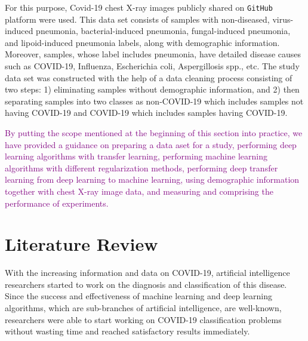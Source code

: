 
For this purpose, Covid-19 chest X-ray images publicly shared on \texttt{GitHub} platform were used. This data set consists of samples with non-diseased, virus-induced pneumonia, bacterial-induced pneumonia, fungal-induced pneumonia, and lipoid-induced pneumonia labels, along with demographic information. Moreover, samples, whose label includes pneumonia, have detailed disease causes such as COVID-19, Influenza, Escherichia coli, Aspergillosis spp., etc. The study data set was constructed with the help of a data cleaning process consisting of two steps: 1) eliminating samples without demographic information, and 2) then separating samples into two classes as non-COVID-19 which includes samples not having COVID-19 and COVID-19 which includes samples having COVID-19.

\textcolor{purple}{By putting the scope mentioned at the beginning of this section into practice, we have provided a guidance on preparing a data aset for a study, performing deep learning algorithms with transfer learning, performing machine learning algorithms with different regularization methods, performing deep transfer learning from deep learning to machine learning, using demographic information together with chest X-ray image data, and measuring and comprising the performance of experiments.}


\section{Literature Review}\label{literaturereview}

With the increasing information and data on COVID-19, artificial intelligence researchers started to work on the diagnosis and classification of this disease. Since the success and effectiveness of machine learning and deep learning algorithms, which are sub-branches of artificial intelligence, are well-known, researchers were able to start working on COVID-19 classification problems without wasting time and reached satisfactory results immediately.


